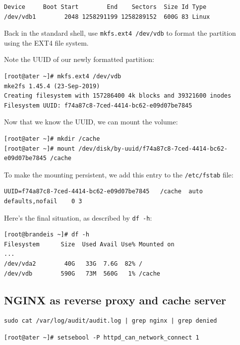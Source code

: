 \begin{verbatim}
Device     Boot Start        End    Sectors  Size Id Type
/dev/vdb1        2048 1258291199 1258289152  600G 83 Linux
\end{verbatim}

Back in the standard shell, use \texttt{mkfs.ext4 /dev/vdb} to format the partition using the EXT4 file system.

Note the UUID of our newly formatted partition:

\begin{verbatim}
[root@ater ~]# mkfs.ext4 /dev/vdb
mke2fs 1.45.4 (23-Sep-2019)
Creating filesystem with 157286400 4k blocks and 39321600 inodes
Filesystem UUID: f74a87c8-7ced-4414-bc62-e09d07be7845
\end{verbatim}

Now that we know the UUID, we can mount the volume:

\begin{verbatim}
[root@ater ~]# mkdir /cache
[root@ater ~]# mount /dev/disk/by-uuid/f74a87c8-7ced-4414-bc62-e09d07be7845 /cache
\end{verbatim}

To make the mounting persistent, we add this entry to the \texttt{/etc/fstab} file:

\begin{verbatim}
UUID=f74a87c8-7ced-4414-bc62-e09d07be7845	/cache	auto defaults,nofail	0 3
\end{verbatim}

Here's the final situation, as described by \texttt{df -h}:

\begin{verbatim}
[root@brandeis ~]# df -h
Filesystem      Size  Used Avail Use% Mounted on
...
/dev/vda2        40G   33G  7.6G  82% /
/dev/vdb        590G   73M  560G   1% /cache
\end{verbatim}

\subsection{NGINX as reverse proxy and cache server}

\begin{verbatim}
sudo cat /var/log/audit/audit.log | grep nginx | grep denied
\end{verbatim}

\begin{verbatim}
[root@ater ~]# setsebool -P httpd_can_network_connect 1
\end{verbatim}

